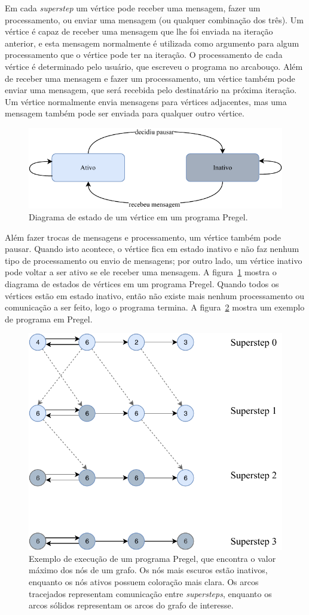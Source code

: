\documentclass[conference]{IEEEtran}
\begin{document}
Em cada {\em superstep} um vértice pode receber uma mensagem, fazer um
processamento, ou enviar uma mensagem (ou qualquer combinação dos três).
Um vértice é capaz de receber uma mensagem que lhe foi enviada na
iteração anterior, e esta mensagem normalmente é utilizada como
argumento para algum processamento que o vértice pode ter na iteração. O
processamento de cada vértice é determinado pelo usuário, que escreveu o
programa no arcabouço. Além de receber uma mensagem e fazer um
processamento, um vértice também pode enviar uma mensagem, que será
recebida pelo destinatário na próxima iteração. Um vértice normalmente
envia mensagens para vértices adjacentes, mas uma mensagem também pode
ser enviada para qualquer outro vértice.

\begin{figure}
    \begin{center}
        \includegraphics[width=.45\textwidth]{pregel/vertex_state.pdf}
    \end{center}
    \caption{Diagrama de estado de um vértice em um programa Pregel.}
    \label{fig:pregel_states}
\end{figure}


Além fazer trocas de mensagens e processamento, um vértice também pode
pausar. Quando isto acontece, o vértice fica em estado inativo e não faz
nenhum tipo de processamento ou envio de mensagens; por outro lado, um
vértice inativo pode voltar a ser ativo se ele receber uma mensagem. A
figura~\ref{fig:pregel_states} mostra o diagrama de estados de vértices
em um programa Pregel.  Quando todos os vértices estão em estado
inativo, então não existe mais nenhum processamento ou comunicação a ser
feito, logo o programa termina. A figura~\ref{fig:execution_example}
mostra um exemplo de programa em Pregel.

\begin{figure}
    \begin{center}
        \includegraphics[width=.45\textwidth,
        clip]{pregel/execution_example.pdf}
    \end{center}
    \caption{Exemplo de execução de um programa Pregel, que encontra o
    valor máximo dos nós de um grafo. Os nós mais escuros estão
    inativos, enquanto os nós ativos possuem coloração mais clara. Os
    arcos tracejados representam comunicação entre {\em supersteps},
    enquanto os arcos sólidos representam os arcos do grafo de
    interesse.
    }
    \label{fig:execution_example}
\end{figure}
\end{document}
